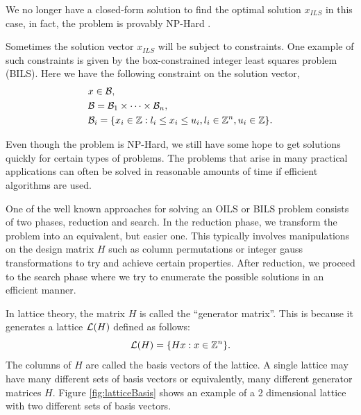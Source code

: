 \documentclass[12pt,Bold,letterpaper]{mcgilletdclass}
\newcommand{\boxcon}{{\cal B}}
\begin{document}
We no longer have a closed-form solution to find the optimal solution $x_{\scriptscriptstyle{ILS}}$ in this case, in fact, the
problem is provably NP-Hard \cite{Mic01}.  

Sometimes the solution vector $x_{\scriptscriptstyle{ILS}}$ will be subject to constraints. One example of such constraints is given by the box-constrained integer least squares
problem (BILS). Here we have the following constraint on the solution
vector, 
\begin{align} \label{eq:boxCon}
&x\in \boxcon,\\
&{\cal B} = {\cal B}_1  \times \cdots \times {\cal B}_n,\\
&\boxcon_i = \{x_i\in\mathbb{Z} : l_i\le x_i \le u_i, l_i\in \mathbb{Z}^n,
u_i\in\mathbb{Z} \}.
\end{align}

Even though the problem is NP-Hard, we still have some hope to get solutions
quickly for certain types of problems. The problems that arise in many practical applications can often be solved in reasonable amounts of time if efficient algorithms are used.

One of the well known approaches for solving an OILS or BILS problem consists of two phases,
reduction and search. In the reduction phase, we transform the problem into an
equivalent, but easier one. This typically involves manipulations on the design matrix $H$ such as column permutations
or integer gauss transformations to try and achieve certain properties. After reduction, we proceed to the search phase where we try to enumerate the possible solutions in an efficient manner.

In lattice theory, the matrix $H$ is called the ``generator matrix''. This is because it generates a lattice ${\cal{L}}(H)$ defined as follows:
\begin{equation}
{\cal{L}}(H) = \{Hx: x\in \mathbb{Z}^n\}.
\end{equation}
The columns of $H$ are called the basis vectors of the lattice. A single lattice may have many different sets of basis vectors or equivalently, many different generator matrices $H$. Figure \ref{fig:latticeBasis} shows an example of a 2 dimensional lattice with two different sets of basis vectors.
\end{document}
